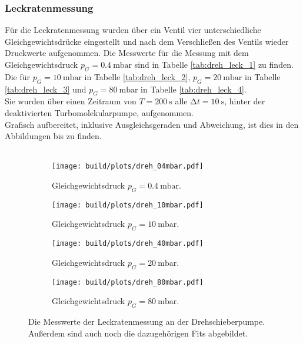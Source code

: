         \subsubsection{Leckratenmessung}

        \noindent Für die Leckratenmessung wurden über ein Ventil vier unterschiedliche Gleichgewichtsdrücke eingestellt
        und nach dem Verschließen des Ventils wieder Druckwerte aufgenommen.
        Die Messwerte für die Messung mit dem Gleichgewichtsdruck $p_G = \SI{0.4}{\milli\bar}$ sind in Tabelle \ref{tab:dreh_leck_1} zu finden.\\
        Die für $p_G = \SI{10}{\milli\bar}$ in Tabelle \ref{tab:dreh_leck_2}, $p_G = \SI{20}{\milli\bar}$ in Tabelle \ref{tab:dreh_leck_3} und $p_G = \SI{80}{\milli\bar}$ in Tabelle \ref{tab:dreh_leck_4}.\\
        Sie wurden über einen Zeitraum von $ T = \SI{200}{\second}$ alle $ \increment t = \SI{10}{\second}$, hinter der deaktivierten Turbomolekularpumpe, aufgenommen.\\
        Grafisch aufbereitet, inklusive Ausgleichsgeraden und Abweichung, ist dies in den Abbildungen  bis  zu finden.\\\\
        \begin{figure}[H]
            \begin{subfigure}{0.46\textwidth}
                    \centering
                    \texttt{[image: build/plots/dreh\_04mbar.pdf]}
                    \caption{Gleichgewichtsdruck $p_G = \SI{0.4}{\milli\bar}$.}
                    \label{img:dreh_leck_1}
            \end{subfigure}
            \hfill
            \begin{subfigure}{0.46\textwidth}
                    \centering
                    \texttt{[image: build/plots/dreh\_10mbar.pdf]}
                    \caption{Gleichgewichtsdruck $p_G = \SI{10}{\milli\bar}$.}
                    \label{img:dreh_leck_2}
            \end{subfigure}
            \hfill
            \begin{subfigure}{0.46\textwidth}
              \centering
              \texttt{[image: build/plots/dreh\_40mbar.pdf]}
              \caption{Gleichgewichtsdruck $p_G = \SI{20}{\milli\bar}$.}
              \label{img:dreh_leck_3}
            \end{subfigure}
            \hfill
            \begin{subfigure}{0.46\textwidth}
              \centering
              \texttt{[image: build/plots/dreh\_80mbar.pdf]}
              \caption{Gleichgewichtsdruck $p_G = \SI{80}{\milli\bar}$.}
              \label{img:dreh_leck_4}
            \end{subfigure}
            \caption{Die Messwerte der Leckratenmessung an der Drehschieberpumpe.\\
            Außerdem sind auch noch die dazugehörigen Fits abgebildet. }
            \label{img:1}
        \end{figure}

